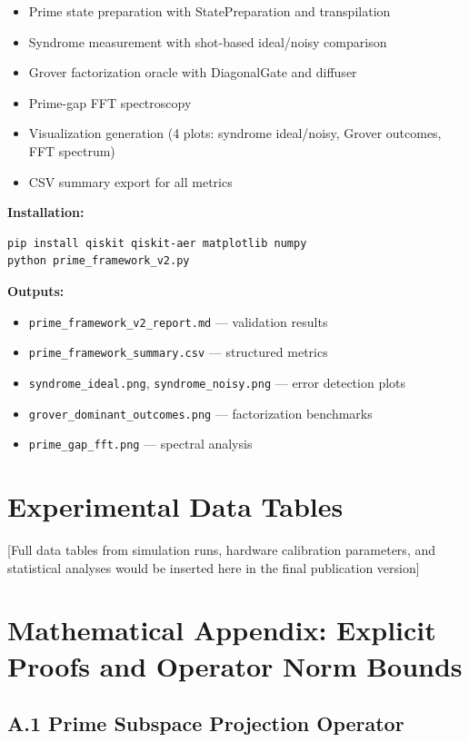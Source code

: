 \documentclass[11pt,letterpaper]{article}
\begin{document}
\begin{itemize}
\item Prime state preparation with StatePreparation and transpilation
\item Syndrome measurement with shot-based ideal/noisy comparison
\item Grover factorization oracle with DiagonalGate and diffuser
\item Prime-gap FFT spectroscopy
\item Visualization generation (4 plots: syndrome ideal/noisy, Grover outcomes, FFT spectrum)
\item CSV summary export for all metrics
\end{itemize}

\textbf{Installation:}
\begin{verbatim}
pip install qiskit qiskit-aer matplotlib numpy
python prime_framework_v2.py
\end{verbatim}

\textbf{Outputs:}
\begin{itemize}
\item \texttt{prime\_framework\_v2\_report.md} — validation results
\item \texttt{prime\_framework\_summary.csv} — structured metrics
\item \texttt{syndrome\_ideal.png}, \texttt{syndrome\_noisy.png} — error detection plots
\item \texttt{grover\_dominant\_outcomes.png} — factorization benchmarks
\item \texttt{prime\_gap\_fft.png} — spectral analysis
\end{itemize}

\section{Experimental Data Tables}

[Full data tables from simulation runs, hardware calibration parameters, and statistical analyses would be inserted here in the final publication version]

\appendix
\section{Mathematical Appendix: Explicit Proofs and Operator Norm Bounds}

\subsection{A.1 Prime Subspace Projection Operator}
\end{document}
